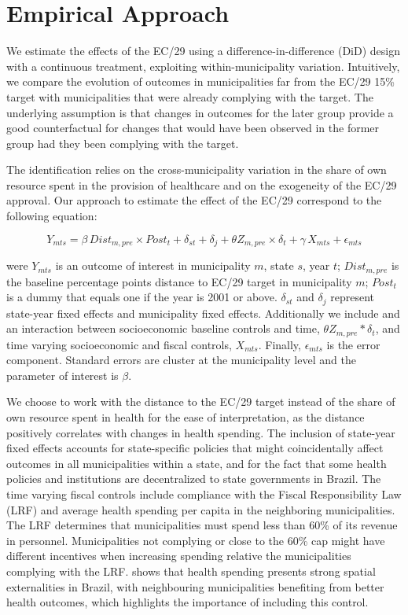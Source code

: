 \section{Empirical Approach}\label{sec:emp}

We estimate the effects of the EC/29 using a difference-in-difference (DiD) design with a continuous treatment, exploiting within-municipality variation. Intuitively, we compare the evolution of outcomes in municipalities far from the EC/29 15\% target with municipalities that were already complying with the target. The underlying assumption is that changes in outcomes for the later group provide a good counterfactual for changes that would have been observed in the former group had they been complying with the target. 

The identification relies on the cross-municipality variation in the share of own resource spent in the provision of healthcare and on the exogeneity of the EC/29 approval. Our approach to estimate the effect of the EC/29 correspond to the following equation:

\begin{equation} \label{eq:1}
    Y_{mts} = \beta \, Dist_{m,pre} \times Post_t  +  \delta_{st} + \delta_j +  \theta Z_{m,pre} \times \delta_{t} + \gamma \, X_{mts} + \epsilon_{mts}
\end{equation}

were $Y_{mts}$ is an outcome of interest in municipality $m$, state $s$, year $t$; $Dist_{m,pre}$ is the baseline percentage points distance to EC/29 target in municipality $m$; $Post_t$ is a dummy that equals one if the year is 2001 or above. $\delta_{st}$ and $\delta_j$ represent state-year fixed effects and municipality fixed effects. Additionally we include and an interaction between socioeconomic baseline controls and time, $\theta Z_{m,pre} * \delta_{t}$, and time varying socioeconomic and fiscal controls, $X_{mts}$. Finally, $\epsilon_{mts}$ is the error component. Standard errors are cluster at the municipality level and the parameter of interest is $\beta$.

We choose to work with the distance to the EC/29 target instead of the share of own resource spent in health for the ease of interpretation, as the distance positively correlates with changes in health spending. The inclusion of state-year fixed effects accounts for state-specific policies that might coincidentally affect outcomes in all municipalities within a state, and for the fact that some health policies and institutions are decentralized to state governments in Brazil. The time varying fiscal controls include compliance with the Fiscal Responsibility Law (LRF) \citep{lrf} and average health spending per capita in the neighboring municipalities. The LRF determines that municipalities must spend less than 60\% of its revenue in personnel. Municipalities not complying or close to the 60\% cap might have different incentives when increasing spending relative the municipalities complying with the LRF. \cite{castro2021effects} shows that health spending presents strong spatial externalities in Brazil, with neighbouring municipalities benefiting from better health outcomes, which highlights the importance of including this control.

